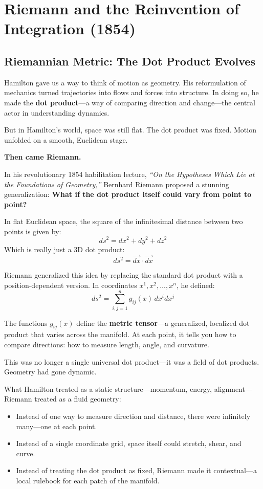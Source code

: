 \section{Riemann and the Reinvention of Integration (1854)}

\subsection{Riemannian Metric: The Dot Product Evolves}

Hamilton gave us a way to think of motion as geometry. His reformulation of mechanics turned trajectories into flows and forces into structure. In doing so, he made the \textbf{dot product}—a way of comparing direction and change—the central actor in understanding dynamics.

But in Hamilton’s world, space was still flat. The dot product was fixed. Motion unfolded on a smooth, Euclidean stage.

\medskip

\textbf{Then came Riemann.}

In his revolutionary 1854 habilitation lecture, \textit{“On the Hypotheses Which Lie at the Foundations of Geometry,”} Bernhard Riemann proposed a stunning generalization:  
\textbf{What if the dot product itself could vary from point to point?}

In flat Euclidean space, the square of the infinitesimal distance between two points is given by:
\[
ds^2 = dx^2 + dy^2 + dz^2
\]
Which is really just a 3D dot product:
\[
ds^2 = \vec{dx} \cdot \vec{dx}
\]

Riemann generalized this idea by replacing the standard dot product with a position-dependent version. In coordinates \( x^1, x^2, \dots, x^n \), he defined:
\[
ds^2 = \sum_{i,j=1}^n g_{ij}(x) \, dx^i dx^j
\]

The functions \( g_{ij}(x) \) define the \textbf{metric tensor}—a generalized, localized dot product that varies across the manifold. At each point, it tells you how to compare directions: how to measure length, angle, and curvature.

This was no longer a single universal dot product—it was a field of dot products. Geometry had gone dynamic.

What Hamilton treated as a static structure—momentum, energy, alignment—Riemann treated as a fluid geometry:

\begin{itemize}
  \item Instead of one way to measure direction and distance, there were infinitely many—one at each point.
  \item Instead of a single coordinate grid, space itself could stretch, shear, and curve.
  \item Instead of treating the dot product as fixed, Riemann made it contextual—a local rulebook for each patch of the manifold.
\end{itemize}

